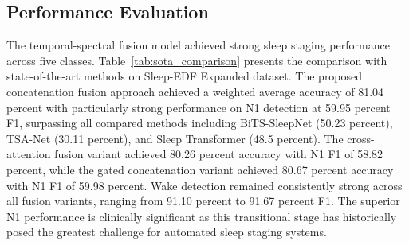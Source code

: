 \documentclass{ieeetj}
\begin{document}
\subsection{Performance Evaluation}

The temporal-spectral fusion model achieved strong sleep staging performance across five classes. Table~\ref{tab:sota_comparison} presents the comparison with state-of-the-art methods on Sleep-EDF Expanded dataset. The proposed concatenation fusion approach achieved a weighted average accuracy of 81.04 percent with particularly strong performance on N1 detection at 59.95 percent F1, surpassing all compared methods including BiTS-SleepNet (50.23 percent), TSA-Net (30.11 percent), and Sleep Transformer (48.5 percent). The cross-attention fusion variant achieved 80.26 percent accuracy with N1 F1 of 58.82 percent, while the gated concatenation variant achieved 80.67 percent accuracy with N1 F1 of 59.98 percent. Wake detection remained consistently strong across all fusion variants, ranging from 91.10 percent to 91.67 percent F1. The superior N1 performance is clinically significant as this transitional stage has historically posed the greatest challenge for automated sleep staging systems.

\begin{table}
\centering
\caption{Comparison with state-of-the-art sleep staging methods on Sleep-EDF Expanded}
\label{tab:sota_comparison}
\end{table}
\end{document}
